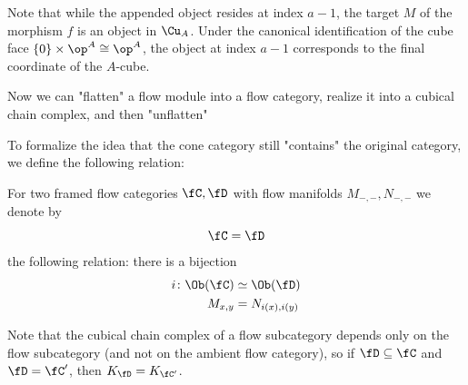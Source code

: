\begin{rem}
Note that while the appended object resides at index $a-1$, the target $M$ of the morphism $f$ is an object in $\Cu_A$. Under the canonical identification of the cube face $\{0\} \times \op^A \cong \op^A$, the object at index $a-1$ corresponds to the final coordinate of the $A$-cube.
\end{rem}

Now we can "flatten" a flow module into a flow category, realize it into a cubical chain complex, and then "unflatten"

To formalize the idea that the cone category still "contains" the original category, we define the following relation:
\begin{notation}\label{FlowCatIso}
    For two framed flow categories $\fC, \fD$ with flow manifolds $M_{-,-}, N_{-,-}$ we denote by
    \begin{equation*}
        \fC = \fD
    \end{equation*}
    the following relation: there is a bijection 
    \begin{align*}
        i \colon \Ob(\fC) &\simeq \Ob(\fD)\\
        M_{x,y} &= N_{i(x),i(y)}
    \end{align*}
\end{notation}

Note that the cubical chain complex of a flow subcategory  depends only on the flow subcategory (and not on the ambient flow category), so if $\fD \subseteq \fC$ and $\fD = \fC'$, then $K_{\fD} = K_{\fC'}$.

